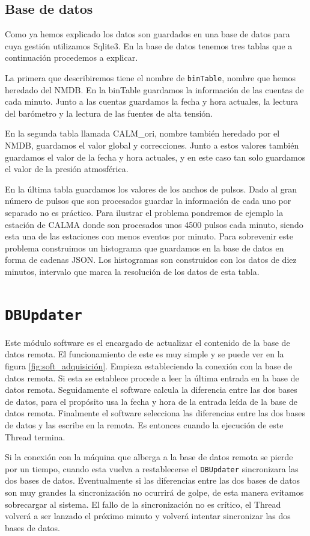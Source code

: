 	\subsection{Base de datos}
		Como ya hemos explicado los datos son guardados en una base de datos para cuya gestión utilizamos Sqlite3. En la base de datos tenemos
		tres tablas que a continuación procedemos a explicar.
	    	\par
	    	La primera que describiremos tiene el nombre de \texttt{binTable}, nombre que hemos heredado del NMDB. En la binTable guardamos la
		información de las cuentas de cada minuto. Junto a las cuentas guardamos la fecha y hora actuales, la lectura del barómetro y la
		lectura de las fuentes de alta tensión.
	    	\par 
	    	En la segunda tabla llamada CALM\_ori, nombre también heredado por el NMDB, guardamos el valor global y correcciones. Junto a estos
		valores también guardamos el valor de la fecha y hora actuales, y en este caso tan solo guardamos el valor de la presión atmosférica.
	    	\par
	    	En la última tabla guardamos los valores de los anchos de pulsos. Dado al gran número de pulsos que son procesados guardar la
		información de cada uno por separado no es práctico. Para ilustrar el problema pondremos de ejemplo la estación de CALMA donde son
		procesados unos 4500 pulsos cada minuto, siendo esta una de las estaciones con menos eventos por minuto. Para sobrevenir este problema
		construimos un histograma que guardamos en la base de datos en forma de cadenas JSON\cite{JSON}. Los histogramas son construidos con
		los datos de diez minutos, intervalo que marca la resolución de los datos de esta tabla.

\section{\texttt{DBUpdater}}
	Este módulo software es el encargado de actualizar el contenido de la base de datos remota. El funcionamiento de este es muy simple y se puede
	ver en la figura \ref{fig:soft_adquisición}. Empieza estableciendo la conexión con la base de datos remota. Si esta se establece procede a leer la
	última entrada en la base de datos remota. Seguidamente el software calcula la diferencia entre las dos bases de datos, para el propósito usa
	la fecha y hora de la entrada leída de la base de datos remota. Finalmente el software selecciona las diferencias entre las dos bases de datos
	y las escribe en la remota. Es entonces cuando la ejecución de este Thread termina. 
	\par
	Si la conexión con la máquina que alberga a la base de datos remota se pierde por un tiempo, cuando esta vuelva a restablecerse el 
	\texttt{DBUpdater} sincronizara las dos bases de datos. Eventualmente si las diferencias entre las dos bases de datos son muy grandes la
	sincronización no ocurrirá de golpe, de esta manera evitamos sobrecargar al sistema. El fallo de la sincronización no es crítico, el Thread
	volverá a ser lanzado el próximo minuto y volverá intentar sincronizar las dos bases de datos.

